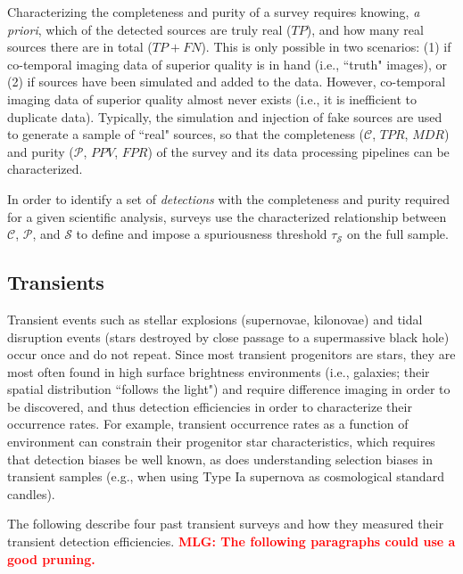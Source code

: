 \documentclass[DM,lsstdraft,toc]{lsstdoc}
\begin{document}
Characterizing the completeness and purity of a survey requires knowing, {\em a priori}, which of the detected sources are truly real ($\mathit{TP}$), and how many real sources there are in total ($\mathit{TP}+\mathit{FN}$). This is only possible in two scenarios: (1) if co-temporal imaging data of superior quality is in hand (i.e., ``truth" images), or (2) if sources have been simulated and added to the data. However, co-temporal imaging data of superior quality almost never exists (i.e., it is inefficient to duplicate data). Typically, the simulation and injection of fake sources are used to generate a sample of ``real" sources, so that the completeness ($\mathcal{C}$, $\mathit{TPR}$, $\mathit{MDR}$) and purity ($\mathcal{P}$, $\mathit{PPV}$, $\mathit{FPR}$) of the survey and its data processing pipelines can be characterized. 

In order to identify a set of {\it detections} with the completeness and purity required for a given scientific analysis, surveys use the characterized relationship between $\mathcal{C}$, $\mathcal{P}$, and $\mathcal{S}$ to define and impose a spuriousness threshold $\tau_{\mathcal{S}}$ on the full sample.


\subsection{Transients}\label{ssec:sci_trans}

Transient events such as stellar explosions (supernovae, kilonovae) and tidal disruption events (stars destroyed by close passage to a supermassive black hole) occur once and do not repeat. Since most transient progenitors are stars, they are most often found in high surface brightness environments (i.e., galaxies; their spatial distribution ``follows the light") and require difference imaging in order to be discovered, and thus detection efficiencies in order to characterize their occurrence rates. For example, transient occurrence rates as a function of environment can constrain their progenitor star characteristics, which requires that detection biases be well known, as does understanding selection biases in transient samples (e.g., when using Type Ia supernova as cosmological standard candles). 

The following describe four past transient surveys and how they measured their transient detection efficiencies. \textcolor{red}{\bf MLG: The following paragraphs could use a good pruning.}
\end{document}
